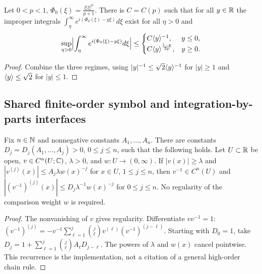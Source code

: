 \begin{lemma}
  \label{lem:appendix_stationary}
  Let $0<p<1$, $\Phi_0(\xi)=\frac{\xi|\xi|^p}{p+1}$. There is $C=C(p)$ such that for all $y\in\mathbb{R}$ the improper integrals $\int_\eta^\infty e^{i(\Phi_0(\xi)-y\xi)}d\xi$ exist for all $\eta>0$ and
  \[
    \sup_{\eta>0}\Bigl|\int_\eta^\infty e^{i(\Phi_0(\xi)-y\xi)}d\xi\Bigr|\le
    \begin{cases}C\langle y \rangle^{-1},&y\le0,\\ C\langle y \rangle^{\frac{1-p}{2p}},&y\ge0.\end{cases}
  \]
\end{lemma}
\begin{proof}
  Combine the three regimes, using $|y|^{-1}\le\sqrt2\langle y \rangle^{-1}$ for $|y|\ge1$ and $\langle y \rangle\le\sqrt2$ for $|y|\le1$.
\end{proof}

\subsection{Shared finite-order symbol and integration-by-parts interfaces}

\begin{lemma}
  \label{lem:c03_reciprocal_symbol}
  Fix $n\in\mathbb{N}$ and nonnegative constants $A_1,\ldots,A_n$.
  There are constants $D_j=D_j(A_1,\ldots,A_j)>0$, $0\le j\le n$, such that the following holds.
  Let $U\subset\mathbb{R}$ be open, $v\in C^n(U;\mathbb{C})$, $\lambda>0$, and $w:U\to(0,\infty)$.
  If $|v(x)|\ge\lambda$ and $|v^{(j)}(x)|\le A_j\lambda w(x)^{-j}$ for
  $x\in U$, $1\le j\le n$, then $v^{-1}\in C^n(U)$ and
  $|(v^{-1})^{(j)}(x)|\le D_j\lambda^{-1}w(x)^{-j}$ for $0\le j\le n$.
  No regularity of the comparison weight $w$ is required.
\end{lemma}
\begin{proof}
  The nonvanishing of $v$ gives regularity. Differentiate $v v^{-1}=1$:
  $(v^{-1})^{(j)}=-v^{-1}\sum_{\ell=1}^j\binom j\ell v^{(\ell)}(v^{-1})^{(j-\ell)}$.
  Starting with $D_0=1$, take $D_j=1+\sum_{\ell=1}^j\binom j\ell A_\ell D_{j-\ell}$.
  The powers of $\lambda$ and $w(x)$ cancel pointwise. This recurrence is the implementation,
  not a citation of a general high-order chain rule.
\end{proof}

